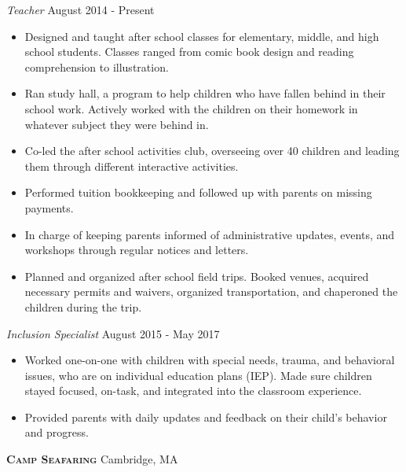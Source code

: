\documentclass[a4paper]{article}
\begin{document}
\begin{addmargin}[1em]{0em}
    \textit{Teacher} \hfill August 2014 - Present\\
    \vspace{-1mm}
    \begin{itemize} \itemsep 1pt
        \item Designed and taught after school classes for elementary, middle, and high 
            school students. Classes ranged from comic book design and reading comprehension
            to illustration.
        \item Ran study hall, a program to help children who have fallen behind in their
            school work. Actively worked with the children on their homework in whatever
            subject they were behind in.
        \item Co-led the after school activities club, overseeing over 40 children and leading
            them through different interactive activities.
        \item Performed tuition bookkeeping and followed up with parents on
            missing payments.
        \item In charge of keeping parents informed of administrative updates, events,
            and workshops through regular notices and letters.
        \item Planned and organized after school field trips. Booked venues, acquired 
            necessary permits and waivers, organized transportation, and chaperoned the
            children during the trip.
        
        
    \end{itemize}
    \textit{Inclusion Specialist} \hfill August 2015 - May 2017\\
    \vspace{-1mm}
    \begin{itemize} \itemsep 1pt
        \item Worked one-on-one with children with special needs, trauma, and behavioral
            issues, who are on individual education plans (IEP). Made sure children stayed
            focused, on-task, and integrated into the classroom experience.
        \item Provided parents with daily updates and feedback on their child's behavior and
            progress.

    \end{itemize}
\end{addmargin}

\textbf{\textsc{Camp Seafaring}} \hfill Cambridge, MA\\
\vspace{2mm}
\end{document}
